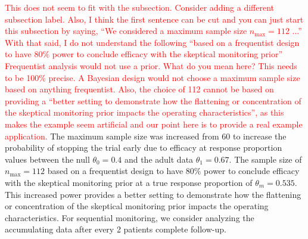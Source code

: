\documentclass[useAMS,usenatbib,referee]{biom}
\begin{document}
\textcolor{red}{This does not seem to fit with the subsection. Consider adding a different subsection label. Also, I think the first sentence can be cut and you can just start this subsection by saying, ``We considered a maximum sample size $n_{\text{max}}=112$ ...'' With that said, I do not understand the following ``based on a frequentist design to have $80\%$ power to conclude efficacy with the skeptical monitoring prior'' Frequentist analysis would not use a prior. What do you mean here? This needs to be 100\% precise. A Bayesian design would not choose a maximum sample size based on anything frequentist. Also, the choice of 112 cannot be based on providing a ``better setting to demonstrate how the flattening or concentration of the skeptical monitoring prior impacts the operating characteristics'', as this makes the example seem artificial and our point here is to provide a real example application.
}
The maximum sample size was increased from $60$ to increase the probability of stopping the trial early due to efficacy at response proportion values between the null $\theta_0=0.4$ and the adult data $\theta_1=0.67$. The sample size of $n_{\text{max}}=112$ based on a frequentist design to have $80\%$ power to conclude efficacy with the skeptical monitoring prior at a true response proportion of $\theta_m=0.535$. This increased power provides a better setting to demonstrate how the flattening or concentration of the skeptical monitoring prior impacts the operating characteristics. For sequential monitoring, we consider analyzing the accumulating data after every 2 patients complete follow-up.
\end{document}

